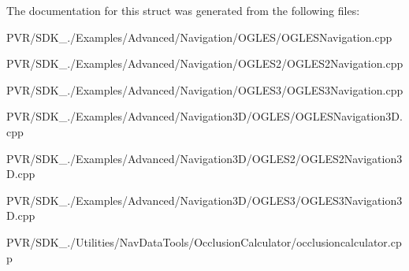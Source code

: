 The documentation for this struct was generated from the following files\+:\begin{DoxyCompactItemize}
\item 
P\+V\+R/\+S\+D\+K\+\_./\+Examples/\+Advanced/\+Navigation/\+O\+G\+L\+E\+S/O\+G\+L\+E\+S\+Navigation.\+cpp\item 
P\+V\+R/\+S\+D\+K\+\_./\+Examples/\+Advanced/\+Navigation/\+O\+G\+L\+E\+S2/O\+G\+L\+E\+S2\+Navigation.\+cpp\item 
P\+V\+R/\+S\+D\+K\+\_./\+Examples/\+Advanced/\+Navigation/\+O\+G\+L\+E\+S3/O\+G\+L\+E\+S3\+Navigation.\+cpp\item 
P\+V\+R/\+S\+D\+K\+\_./\+Examples/\+Advanced/\+Navigation3\+D/\+O\+G\+L\+E\+S/O\+G\+L\+E\+S\+Navigation3\+D.\+cpp\item 
P\+V\+R/\+S\+D\+K\+\_./\+Examples/\+Advanced/\+Navigation3\+D/\+O\+G\+L\+E\+S2/O\+G\+L\+E\+S2\+Navigation3\+D.\+cpp\item 
P\+V\+R/\+S\+D\+K\+\_./\+Examples/\+Advanced/\+Navigation3\+D/\+O\+G\+L\+E\+S3/O\+G\+L\+E\+S3\+Navigation3\+D.\+cpp\item 
P\+V\+R/\+S\+D\+K\+\_./\+Utilities/\+Nav\+Data\+Tools/\+Occlusion\+Calculator/occlusioncalculator.\+cpp\end{DoxyCompactItemize}
